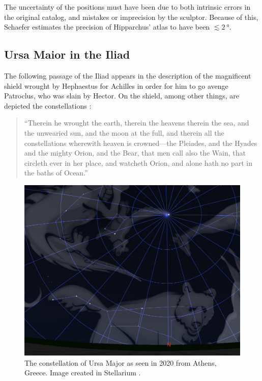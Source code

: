 \documentclass[main.tex]{subfiles}
\begin{document}
The uncertainty of the positions must have been due to both intrinsic errors in the original catalog, and mistakes or imprecision by the sculptor.
Because of this, Schaefer estimates the precision of Hipparchus' atlas to have been \(\lesssim \SI{2}{\degree}\).

\subsection{Ursa Maior in the Iliad}

The following passage of the Iliad appears in the description of the magnificent shield wrought by Hephaestus for Achilles in order for him to go avenge Patroclus, who was slain by Hector.
On the shield, among other things, are depicted the constellations \cite[XVIII, 483--490]{murrayIliad1924}: 
%
\begin{quotation}
``Therein he wrought the earth, therein the heavens therein the sea, and the unwearied sun, and the moon at the full, and therein all the constellations wherewith heaven is crowned—the Pleiades, and the Hyades and the mighty Orion, and the Bear, that men call also the Wain, that circleth ever in her place, and watcheth Orion, and alone hath no part in the baths of Ocean.''
\end{quotation}

\begin{figure}[ht]
\centering
\includegraphics[width=\textwidth]{figures/ursa_maior_today.png}
\caption{The constellation of Ursa Major as seen in 2020 from Athens, Greece. Image created in Stellarium \cite[]{stellariumcontributorsStellariumAstronomySoftware2020}.}
\label{fig:ursa-now}
\end{figure}
\end{document}
